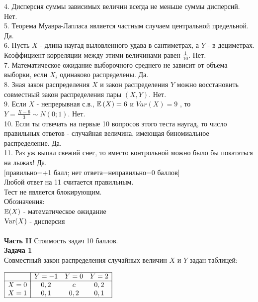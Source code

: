 \documentclass[12pt, a4paper]{article}\usepackage[]{graphicx}\usepackage[]{color}
\begin{document}
	4. Дисперсия суммы зависимых величин всегда не меньше суммы
	дисперсий. Нет. \\

	5. Теорема Муавра-Лапласа является частным случаем центральной
	предельной. Да. \\

	6. Пусть $X$ - длина наугад выловленного удава в сантиметрах, а
	$Y$ - в дециметрах. Коэффициент корреляции между этими
	величинами равен $\frac{1}{10}$. Нет. \\

	7. Математическое ожидание выборочного среднего не зависит от
	объема выборки, если $X_{i}$ одинаково распределены. Да. \\

	8. Зная закон распределения $X$ и закон распределения $Y$
	можно восстановить совместный закон распределения пары $(X,Y)$. Нет. \\

	9. Если  $X$  - непрерывная с.в.,  $\mathbb{E}\left(X\right)=6$  и
	$Var\left(X\right)=9$ , то  $Y=\frac{X-6}{3} \sim
	N\left(0;1\right)$.  Нет. \\

	10. Если ты отвечать на первые 10 вопросов этого теста наугад, то
	число правильных ответов - случайная величина, имеющая
	биномиальное распределение. Да. \\

	11. Раз уж выпал свежий снег, то вместо контрольной можно
	было бы покататься на лыжах! Да. \\


	$[$правильно=+1 балл; нет ответа=неправильно=0 баллов$]$ \\
	Любой ответ на 11 считается правильным. \\
	Тест не является блокирующим. \\
	Обозначения: \\
	$\mathbb{E}(X)$ - математическое ожидание \\
	$\operatorname{Var}(X)$ - дисперсия \\ \\


	\textbf{Часть II} Стоимость задач 10 баллов. \\


	\textbf{Задача 1} \\ %
	Совместный закон распределения случайных величин  $X$  и  $Y$
	задан таблицей:

	$\begin{array}{|c|ccc|}
	\hline
	{} & {Y=-1} & {Y=0} & {Y=2}\\
	\hline
	{X=0} & {0,2} & {c} & {0,2}\\
	{X=1} & {0,1} & {0,2} & {0,1} \\
	\hline
	\end{array}$
\end{document}
